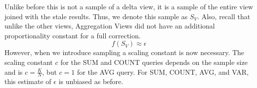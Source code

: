Unlike before this is not a sample of a delta view, it is a sample of the entire view joined with the stale results.
Thus, we denote this sample as $S_{V}$.
Also, recall that unlike the other views, Aggregation Views did not have 
an additional proportionality constant for a full correction.
\[
f(S_{V})\approx\epsilon
\]
However, when we introduce sampling a scaling constant is now necessary.
The scaling constant $c$ for the SUM and COUNT queries depends on the sample size and is $c = \frac{K}{N}$, 
but $c = 1$ for the AVG query.
For SUM, COUNT, AVG, and VAR, this estimate of $\epsilon$ is unbiased as before.
\fi

